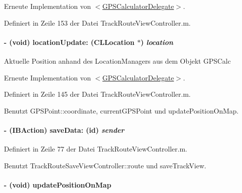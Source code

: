 Erneute Implementation von \hyperlink{protocol_g_p_s_calculator_delegate-p_a890f58f3468025f475f8bb7d9aa33332}{$<$GPSCalculatorDelegate$>$}.

Definiert in Zeile 153 der Datei TrackRouteViewController.m.\hypertarget{interface_track_route_view_controller_a5e00299e28aae82b6687fc1321ed1873}{
\paragraph[{locationUpdate:}]{\setlength{\rightskip}{0pt plus 5cm}-\/ (void) locationUpdate: (CLLocation $\ast$) {\em location}}\hfill}
\label{interface_track_route_view_controller_a5e00299e28aae82b6687fc1321ed1873}
Aktuelle Position anhand des LocationManagers aus dem Objekt GPSCalc 

Erneute Implementation von \hyperlink{protocol_g_p_s_calculator_delegate-p_a0adb149b836a8e03a11ea255a5f01a31}{$<$GPSCalculatorDelegate$>$}.

Definiert in Zeile 145 der Datei TrackRouteViewController.m.

Benutzt GPSPoint::coordinate, currentGPSPoint und updatePositionOnMap.\hypertarget{interface_track_route_view_controller_afb7c18ca4ee200ca7dc53970875d4447}{
\paragraph[{saveData:}]{\setlength{\rightskip}{0pt plus 5cm}-\/ (IBAction) saveData: (id) {\em sender}}\hfill}
\label{interface_track_route_view_controller_afb7c18ca4ee200ca7dc53970875d4447}


Definiert in Zeile 77 der Datei TrackRouteViewController.m.

Benutzt TrackRouteSaveViewController::route und saveTrackView.\hypertarget{interface_track_route_view_controller_a33a6dc8e9818b566b1d15b9a1c6130f0}{
\paragraph[{updatePositionOnMap}]{\setlength{\rightskip}{0pt plus 5cm}-\/ (void) updatePositionOnMap }\hfill}
\label{interface_track_route_view_controller_a33a6dc8e9818b566b1d15b9a1c6130f0}


